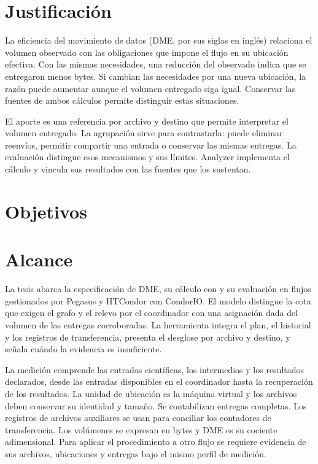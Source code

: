 \section{Justificación}
La eficiencia del movimiento de datos (DME, por sus siglas en inglés) relaciona el volumen observado con las obligaciones que impone el flujo en su ubicación efectiva. Con las mismas necesidades, una reducción del observado indica que se entregaron menos bytes. Si cambian las necesidades por una nueva ubicación, la razón puede aumentar aunque el volumen entregado siga igual. Conservar las fuentes de ambos cálculos permite distinguir estas situaciones.

El aporte es una referencia por archivo y destino que permite interpretar el volumen entregado. La agrupación sirve para contrastarla: puede eliminar reenvíos, permitir compartir una entrada o conservar las mismas entregas. La evaluación distingue esos mecanismos y sus límites. Analyzer implementa el cálculo y vincula sus resultados con las fuentes que los sustentan.

\section{Objetivos}


\section{Alcance}
La tesis abarca la especificación de DME, su cálculo con \Analyzer{} y su evaluación en flujos gestionados por Pegasus y HTCondor con CondorIO. El modelo distingue la cota que exigen el grafo y el relevo por el coordinador con una asignación dada del volumen de las entregas corroboradas. La herramienta integra el plan, el historial y los registros de transferencia, presenta el desglose por archivo y destino, y señala cuándo la evidencia es insuficiente.

La medición comprende las entradas científicas, los intermedios y los resultados declarados, desde las entradas disponibles en el coordinador hasta la recuperación de los resultados. La unidad de ubicación es la máquina virtual y los archivos deben conservar su identidad y tamaño. Se contabilizan entregas completas. Los registros de archivos auxiliares se usan para conciliar los contadores de transferencia. Los volúmenes se expresan en bytes y DME es su cociente adimensional. Para aplicar el procedimiento a otro flujo se requiere evidencia de sus archivos, ubicaciones y entregas bajo el mismo perfil de medición.

